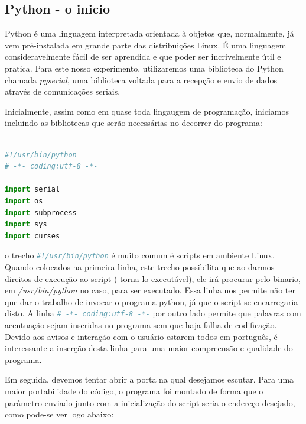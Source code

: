 \begin{multicols}{2}
\subsection{Python - o inicio}\label{python1}

Python é uma linguagem interpretada orientada à objetos que, normalmente, já vem pré-instalada em grande parte das distribuições Linux. É uma linguagem consideravelmente fácil de ser aprendida e que poder ser incrivelmente útil e pratica. Para este nosso experimento, utilizaremos uma biblioteca do Python chamada \textit{\cite{pyserial}pyserial}, uma biblioteca voltada para a recepção e envio de dados através de comunicações seriais.

Inicialmente, assim como em quase toda lingaugem de programação, iniciamos incluindo as bibliotecas que serão necessárias no decorrer do programa:


\begin{lstlisting}[basicstyle=\ttfamily,language=Python,numbers=none,caption={[Bibliotecas do Python] Inclusão das bibliotecas do Python}]

#!/usr/bin/python
# -*- coding:utf-8 -*-

import serial
import os
import subprocess
import sys
import curses

\end{lstlisting}

o trecho \lstinline [basicstyle=\ttfamily,language=Python]{#!/usr/bin/python} é muito comum é scripts em ambiente Linux. Quando colocados na primeira linha, este trecho possibilita que ao darmos direitos de execução ao script ( torna-lo executável), ele irá procurar pelo binario, em \textit{/usr/bin/python} no caso, para ser executado. Essa linha nos permite não ter que dar o trabalho de invocar o programa python, já que o script se encarregaria disto. A linha  \lstinline [basicstyle=\ttfamily,language=Python]{# -*- coding:utf-8 -*-} por outro lado permite que palavras com acentuação sejam inseridas no programa sem que haja falha de codificação. Devido aos avisos e interação com o usuário estarem todos em português, é interessante a inserção desta linha para uma maior compreensão e qualidade do programa.

Em seguida, devemos tentar abrir a porta na qual desejamos escutar. Para uma maior portabilidade do código, o programa foi montado de forma que o parâmetro enviado junto com a inicialização do script seria o endereço desejado, como pode-se ver logo abaixo:

\begin{lstlisting}[basicstyle=\ttfamily,language=Python,numbers=none,caption={[Acessando a porta serial]Acessando a porta serial}]


\end{lstlisting}
\end{multicols}
